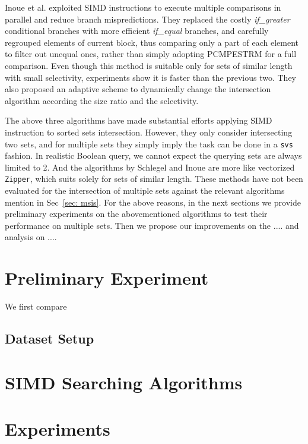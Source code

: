\documentclass[runningheads,a4paper]{llncs}
\begin{document}
Inoue et al. \cite{Inoue2014Faster} exploited SIMD instructions to execute multiple comparisons in parallel and reduce branch mispredictions.
They replaced the costly \textit{if\_greater} conditional branches with more efficient \textit{if\_equal} branches, and carefully regrouped elements of current block, thus comparing only a part of each element to filter out unequal ones, rather than simply adopting \textsf{PCMPESTRM} for a full comparison.
Even though this method is suitable only for sets of similar length with small selectivity, experiments show it is faster than the previous two.
They also proposed an adaptive scheme to dynamically change the intersection algorithm according the size ratio and the selectivity.

The above three algorithms have made substantial efforts applying SIMD instruction to sorted sets intersection.
However, they only consider intersecting two sets, and for multiple sets they simply imply the task can be done in a \texttt{svs} fashion.
In realistic Boolean query, we cannot expect the querying sets are always limited to 2.
And the algorithms by Schlegel and Inoue are more like vectorized \texttt{Zipper}, which suits solely for sets of similar length.
These methods have not been evaluated for the intersection of multiple sets against the relevant algorithms mention in Sec~\ref{sec: msis}.
For the above reasons, in the next sections we provide preliminary experiments on the abovementioned algorithms to test their performance on multiple sets.
Then we propose our improvements on the .... and analysis on ....
\section{Preliminary Experiment}
We first compare
\subsection{Dataset Setup}
\section{SIMD Searching Algorithms}
\section{Experiments}
\end{document}
